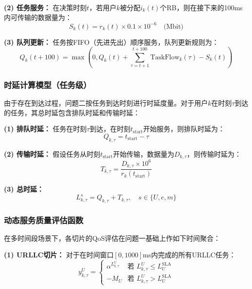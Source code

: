 \textbf{(2) 任务服务：}
在决策时刻$t$，若用户$k$被分配$i_k(t)$个RB，则在接下来的100ms内可传输的数据量为：
\begin{equation}
S_k(t) = r_k(t) \times 0.1 \times 10^{-6} \quad \text{(Mbit)}
\end{equation}

\textbf{(3) 队列更新：}
任务按FIFO（先进先出）顺序服务，队列更新规则为：
\begin{equation}
Q_k(t+100) = \max\left(0, Q_k(t) + \sum_{\tau=t+1}^{t+100} \text{TaskFlow}_k(\tau) - S_k(t)\right)
\end{equation}

\subsubsection{时延计算模型（任务级）}
 
由于存在到达过程，问题二按任务到达时刻进行时延度量。对于用户$k$在时刻$\tau$到达的任务，其总时延包含排队时延和传输时延：

\textbf{(1) 排队时延：}
任务在时刻$\tau$到达，在时刻$t_{\text{start}}$开始服务，则排队时延为：
\begin{equation}
Q_{k,\tau} = t_{\text{start}} - \tau
\end{equation}

\textbf{(2) 传输时延：}
假设任务从时刻$t_{\text{start}}$开始传输，数据量为$D_{k,\tau}$，则传输时延为：
\begin{equation}
T_{k,\tau} = \frac{D_{k,\tau} \times 10^6}{r_k(t_{\text{start}})}
\end{equation}

\textbf{(3) 总时延：}
\begin{equation}
L_{k,\tau}^s = Q_{k,\tau} + T_{k,\tau}, \quad s \in \{U, e, m\}
\end{equation}

\subsubsection{动态服务质量评估函数}
 
在多时间段场景下，各切片的QoS评估在问题一基础上作如下时间聚合：

\textbf{(1) URLLC切片：}
对于在时间窗口$[0, 1000]$ms内完成的所有URLLC任务：
\begin{equation}
y_{k,\tau}^{U} = \begin{cases}
\alpha^{L_{k,\tau}^{U}} & \text{若 } L_{k,\tau}^{U} \leq L_{U}^{\text{SLA}} \\
-M_{U} & \text{若 } L_{k,\tau}^{U} > L_{U}^{\text{SLA}}
\end{cases}
\end{equation}

